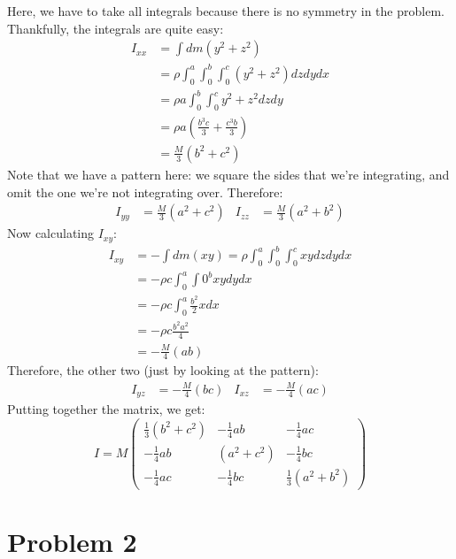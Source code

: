 \documentclass[10pt]{article}
\begin{document}
\begin{enumerate}[label=\alph*)]
				\begin{solution}
					Here, we have to take all integrals because there is no symmetry in the problem. Thankfully,
					the integrals are quite easy:
					\begin{align*}
						I_{xx} &= \int dm (y^2 + z^2)\\
						&= \rho \int_0^a \int_0^b \int_0^c (y^2 + z^2) dz dy dx \\
						&= \rho a \int_0^b \int_0^c y^2 + z^2 dz dy  \\
						&= \rho a\left( \frac{b^3c}{3} + \frac{c^3b}{3} \right)  \\
						&= \frac{M}{3}(b^2 + c^2) 
					\end{align*}
					Note that we have a pattern here: we square the sides that we're integrating, and omit the 
					one we're not integrating over. Therefore:
					\begin{align*}
						I_{yy} &= \frac{M}{3}(a^2 + c^2) & I_{zz} &= \frac{M}{3}(a^2 + b^2)
					\end{align*}
					Now calculating $I_{xy}$:
					\begin{align*}
						I_{xy} &= -\int dm (xy) = \rho \int_0^a \int_0^b \int_0^c xy dz dy dx\\
						&= -\rho c \int_0^a \int 0^b xy dy dx \\
						&= -\rho c\int_0^a \frac{b^2}{2}x dx \\
						&= -\rho c \frac{b^2 a^2}{4} \\
						&= -\frac{M}{4}(ab) 
					\end{align*}
					Therefore, the other two (just by looking at the pattern):
					\begin{align*}
						I_{yz} &=- \frac{M}{4}(bc) & I_{xz} &=- \frac{M}{4}(ac)
					\end{align*}
					Putting together the matrix, we get:
					\[
						I =M \begin{pmatrix} \frac{1}{3}(b^2 + c^2) &- \frac{1}{4}ab & -\frac{1}{4}ac \\
							-\frac{1}{4}ab & (a^2 + c^2) & -\frac{1}{4}bc\\
							-\frac{1}{4}ac& - \frac{1}{4}bc & \frac{1}{3}(a^2 + b^2)
						\end{pmatrix} 
					\] 
				\end{solution}
	\end{enumerate}

	\pagebreak
	\section*{Problem 2}
\end{document}

